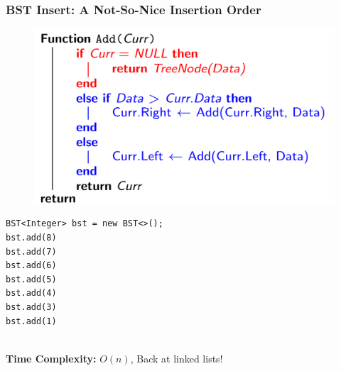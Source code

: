 \documentclass{beamer}
\begin{document}
\begin{frame}[fragile]
    \frametitle{BST Insert: A Not-So-Nice Insertion Order}
    \begin{minipage}{0.45\textwidth}
        \begin{figure}
            \includegraphics[width=\textwidth]{./imgs/bstadd.png}
        \end{figure}
        \begin{lstlisting}[frame=trBL, basicstyle=\tiny]
BST<Integer> bst = new BST<>();
bst.add(8)
bst.add(7)
bst.add(6)
bst.add(5)
bst.add(4)
bst.add(3)
bst.add(1)
        \end{lstlisting}
    \end{minipage}
    \begin{minipage}{0.45\textwidth}
    \end{minipage}
    \pause 
    \\\textbf{Time Complexity: } $O(n)$, Back at linked lists!
\end{frame}
\end{document}
